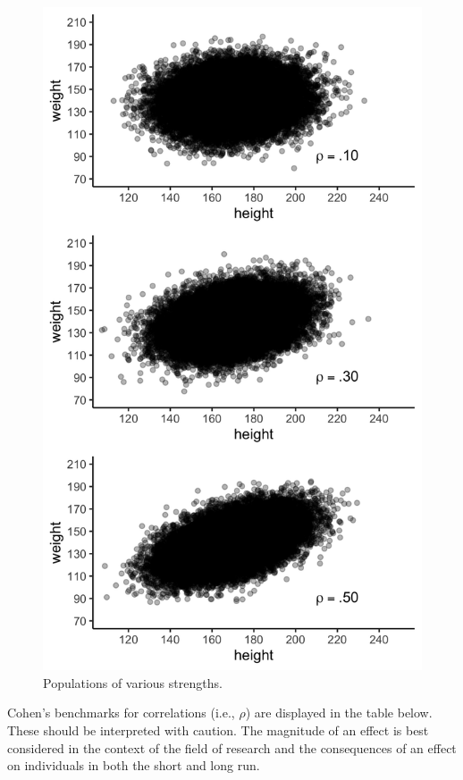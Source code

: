 \documentclass[
]{krantz}
\begin{document}
\begin{figure}
\includegraphics[width=16.67in,height=0.8\textheight]{ch_populations/images/rho_example} \caption{Populations of various strengths.}\label{fig:rhoplot}
\end{figure}

Cohen's benchmarks for correlations (i.e., \(\rho\)) are displayed in the table below. These should be interpreted with caution. The magnitude of an effect is best considered in the context of the field of research and the consequences of an effect on individuals in both the short and long run.
\end{document}
